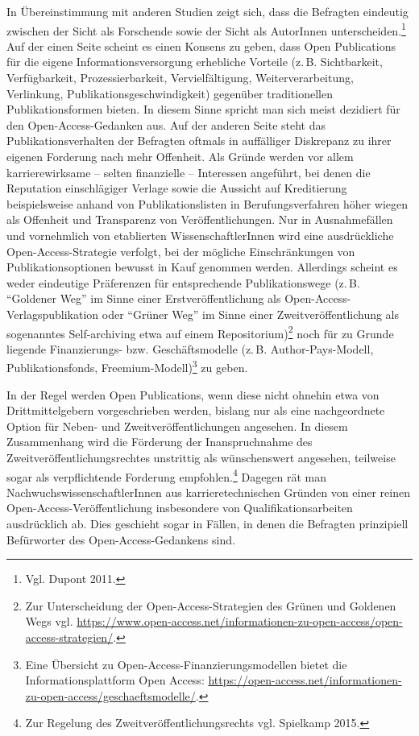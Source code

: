 \documentclass[a4paper,
fontsize=11pt,
oneside,
numbers=noperiodatend,
parskip=half-,
bibliography=totoc,
final
]{scrartcl}
\begin{document}
In Übereinstimmung mit anderen Studien zeigt sich, dass die Befragten
eindeutig zwischen der Sicht als Forschende sowie der Sicht als
AutorInnen unterscheiden.\footnote{Vgl. Dupont 2011.} Auf der einen
Seite scheint es einen Konsens zu geben, dass Open Publications für die
eigene Informationsversorgung erhebliche Vorteile (z.\,B. Sichtbarkeit,
Verfügbarkeit, Prozessierbarkeit, Vervielfältigung, Weiterverarbeitung,
Verlinkung, Publikationsgeschwindigkeit) gegenüber traditionellen
Publikationsformen bieten. In diesem Sinne spricht man sich meist
dezidiert für den Open-Access-Gedanken aus. Auf der anderen Seite steht
das Publikationsverhalten der Befragten oftmals in auffälliger
Diskrepanz zu ihrer eigenen Forderung nach mehr Offenheit. Als Gründe
werden vor allem karrierewirksame -- selten finanzielle -- Interessen
angeführt, bei denen die Reputation einschlägiger Verlage sowie die
Aussicht auf Kreditierung beispielsweise anhand von Publikationslisten
in Berufungsverfahren höher wiegen als Offenheit und Transparenz von
Veröffentlichungen. Nur in Ausnahmefällen und vornehmlich von
etablierten WissenschaftlerInnen wird eine ausdrückliche
Open-Access-Strategie verfolgt, bei der mögliche Einschränkungen von
Publikationsoptionen bewusst in Kauf genommen werden. Allerdings scheint
es weder eindeutige Präferenzen für entsprechende Publikationswege (z.\,B.
\enquote{Goldener Weg} im Sinne einer Erstveröffentlichung als
Open-Access-Verlagspublikation oder \enquote{Grüner Weg} im Sinne einer
Zweitveröffentlichung als sogenanntes Self-archiving etwa auf einem
Repositorium)\footnote{Zur Unterscheidung der Open-Access-Strategien des
  Grünen und Goldenen Wegs vgl.
  \url{https://www.open-access.net/informationen-zu-open-access/open-access-strategien/}.}
noch für zu Grunde liegende Finanzierungs- bzw. Geschäftsmodelle (z.\,B.
Author-Pays-Modell, Publikationsfonds, Freemium-Modell)\footnote{Eine
  Übersicht zu Open-Access-Finanzierungsmodellen bietet die
  Informationsplattform Open Access:
  \url{https://open-access.net/informationen-zu-open-access/geschaeftsmodelle/}.}
zu geben.

In der Regel werden Open Publications, wenn diese nicht ohnehin etwa von
Drittmittelgebern vorgeschrieben werden, bislang nur als eine
nachgeordnete Option für Neben- und Zweitveröffentlichungen angesehen.
In diesem Zusammenhang wird die Förderung der Inanspruchnahme des
Zweitveröffentlichungsrechtes unstrittig als wünschenswert angesehen,
teilweise sogar als verpflichtende Forderung empfohlen.\footnote{Zur
  Regelung des Zweitveröffentlichungsrechts vgl. Spielkamp 2015.}
Dagegen rät man NachwuchswissenschaftlerInnen aus karrieretechnischen
Gründen von einer reinen Open-Access-Veröffentlichung insbesondere von
Qualifikationsarbeiten ausdrücklich ab. Dies geschieht sogar in Fällen,
in denen die Befragten prinzipiell Befürworter des Open-Access-Gedankens
sind.
\end{document}
